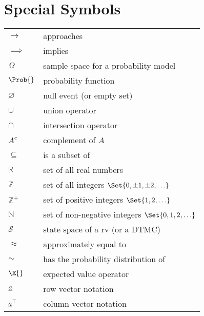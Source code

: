 \section{Special Symbols}
\begin{tabular}{ll}
    $ \rightarrow $      & approaches                                              \\
    $ \implies $         & implies                                                 \\
    $ \Omega $           & sample space for a probability model                    \\
    $ \Prob{} $          & probability function                                    \\
    $ \varnothing $      & null event (or empty set)                               \\
    $ \cup $             & union operator                                          \\
    $ \cap $             & intersection operator                                   \\
    $ A^c $              & complement of $ A $                                     \\
    $ \subseteq $        & is a subset of                                          \\
    $ \mathbb{R} $       & set of all real numbers                                 \\
    $ \mathbb{Z} $       & set of all integers $ \Set{0,\pm 1,\pm 2,\ldots} $      \\
    $ \mathbb{Z}^+ $     & set of positive integers $ \Set{1,2,\ldots} $           \\
    $ \mathbb{N} $       & set of non-negative integers $ \Set{0,1,2,\ldots} $     \\
    $ \mathcal{S} $      & state space of a rv (or a DTMC)                         \\
    $ \approx $          & approximately equal to                                  \\
    $ \sim $             & has the probability distribution of                     \\
    $ \E{} $             & expected value operator                                 \\
    $ \underline{a} $       & row vector notation                                     \\
    $ \underline{a}^\top $  & column vector notation                                  \\

\end{tabular}
